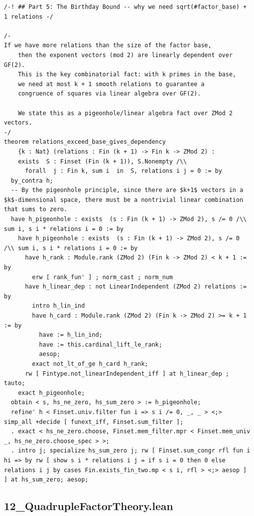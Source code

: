 \documentclass[11pt,openright,twoside]{book}
\theoremstyle{definition}
\begin{document}
\begin{lstlisting}[style=lean]
/-! ## Part 5: The Birthday Bound -- why we need sqrt(#factor_base) + 1 relations -/

/-
If we have more relations than the size of the factor base,
    then the exponent vectors (mod 2) are linearly dependent over GF(2).
    This is the key combinatorial fact: with k primes in the base,
    we need at most k + 1 smooth relations to guarantee a
    congruence of squares via linear algebra over GF(2).

    We state this as a pigeonhole/linear algebra fact over ZMod 2 vectors.
-/
theorem relations_exceed_base_gives_dependency
    {k : Nat} (relations : Fin (k + 1) -> Fin k -> ZMod 2) :
    exists  S : Finset (Fin (k + 1)), S.Nonempty /\\
      forall  j : Fin k, sum i  in  S, relations i j = 0 := by
  by_contra h;
  -- By the pigeonhole principle, since there are $k+1$ vectors in a $k$-dimensional space, there must be a nontrivial linear combination that sums to zero.
  have h_pigeonhole : exists  (s : Fin (k + 1) -> ZMod 2), s /= 0 /\\ sum i, s i * relations i = 0 := by
    have h_pigeonhole : exists  (s : Fin (k + 1) -> ZMod 2), s /= 0 /\\ sum i, s i * relations i = 0 := by
      have h_rank : Module.rank (ZMod 2) (Fin k -> ZMod 2) < k + 1 := by
        erw [ rank_fun' ] ; norm_cast ; norm_num
      have h_linear_dep : not LinearIndependent (ZMod 2) relations := by
        intro h_lin_ind
        have h_card : Module.rank (ZMod 2) (Fin k -> ZMod 2) >= k + 1 := by
          have := h_lin_ind;
          have := this.cardinal_lift_le_rank;
          aesop;
        exact not_lt_of_ge h_card h_rank;
      rw [ Fintype.not_linearIndependent_iff ] at h_linear_dep ; tauto;
    exact h_pigeonhole;
  obtain < s, hs_ne_zero, hs_sum_zero > := h_pigeonhole;
  refine' h < Finset.univ.filter fun i => s i /= 0, _, _ > <;> simp_all +decide [ funext_iff, Finset.sum_filter ];
  . exact < hs_ne_zero.choose, Finset.mem_filter.mpr < Finset.mem_univ _, hs_ne_zero.choose_spec > >;
  . intro j; specialize hs_sum_zero j; rw [ Finset.sum_congr rfl fun i hi => by rw [ show s i * relations i j = if s i = 0 then 0 else relations i j by cases Fin.exists_fin_two.mp < s i, rfl > <;> aesop ] ] at hs_sum_zero; aesop;
\end{lstlisting}

\clearpage


\subsection*{12\_QuadrupleFactorTheory.lean}
\label{lean:12_QuadrupleFactorTheory}
\end{document}
